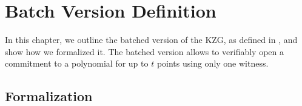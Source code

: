 \chapter{Batch Version Definition}\label{chapter:batch_def}

In this chapter, we outline the batched version of the KZG, as defined in \parencite{KZG}, and show how we formalized it.
The batched version allows to verifiably open a commitment to a polynomial for up to $t$ points using only one witness. 


\section{Formalization}